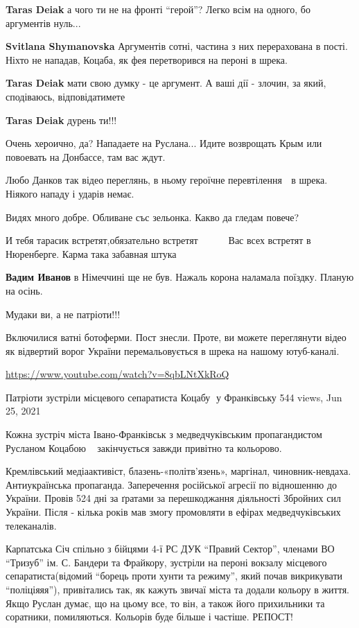 \begin{itemize}
\textbf{Taras Deiak} а чого ти не на фронті \enquote{герой}? Легко всім на одного, бо аргументів нуль...

\textbf{Svitlana Shymanovska} Аргументів сотні, частина з них перерахована в
пості. Ніхто не нападав, Коцаба, як фея перетворився на пероні в шрека.

\textbf{Taras Deiak} мати свою думку - це аргумент. А ваші дії - злочин, за який, сподіваюсь, відповідатимете

\textbf{Taras Deiak} дурень ти!!!

Очень хероично, да? Нападаете на Руслана... Идите возврощать Крым или повоевать на Донбассе, там вас ждут.

Любо Данков так відео переглянь, в ньому героїчне перевтілення 🐖 в шрека. Ніякого нападу і ударів немає.

Видях много добре. Обливане със зельонка. Какво да гледам повече?

И тебя тарасик встретят,обязательно встретят 🤬🤬🤬🤬🤬🤬🤬🤬🤬🤬Вас всех встретят в Нюренберге. Карма така забавная штука

\textbf{Вадим Иванов} в Німеччині ще не був. Нажаль корона наламала поїздку. Планую на осінь.

Мудаки ви, а не патріоти!!!

Включилися ватні ботоферми. Пост знесли.
Проте, ви можете переглянути відео як відвертий ворог України перемальовується в шрека на нашому ютуб-каналі.

\par\url{https://www.youtube.com/watch?v=8qbLNtXkRoQ}

Патріоти зустріли місцевого сепаратиста Коцабу🐔 у Франківську
544 views, Jun 25, 2021

Кожна зустріч міста Івано-Франківськ з медведчуківським пропагандистом Русланом
Коцабою🐔🇷🇺 закінчується завжди привітно та кольорово.

Кремлівський медіаактивіст, блазень-«політв’язень», маргінал, чиновник-невдаха.
Антиукраїнська пропаганда. Заперечення російської агресії по відношенню до
України. Провів 524 дні за ґратами за перешкоджання діяльності Збройних сил
України. Після - кілька років мав змогу промовляти в ефірах медведчуківських
телеканалів.

Карпатська Січ спільно з бійцями 4-ї РС ДУК \enquote{Правий Сектор}, членами ВО
\enquote{Тризуб} ім. С. Бандери та Фрайкору,  зустріли на пероні вокзалу місцевого
сепаратиста(відомий \enquote{борець проти хунти та режиму}, який почав викрикувати
\enquote{поліціяяя}), привітались так, як кажуть звичаї міста та додали кольору в
життя. Якщо Руслан думає, що на цьому все, то він, а також його прихильники та
соратники, помиляються. Кольорів буде більше і частіше. РЕПОСТ!👊🏻 


\end{itemize}
